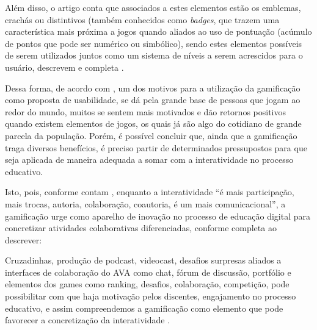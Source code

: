 Além disso, o artigo conta que associados a estes elementos estão os emblemas, crachás ou distintivos (também conhecidos como \textsl{badges}, que trazem uma característica mais próxima a jogos quando aliados ao uso de pontuação (acúmulo de pontos que pode ser numérico ou simbólico), sendo estes elementos possíveis de serem utilizados juntos como um sistema de níveis a serem acrescidos para o usuário, descrevem  e completa  .

Dessa forma, de acordo com , um dos motivos para a utilização da gamificação como proposta de usabilidade, se dá pela grande base de pessoas que jogam ao redor do mundo, muitos se sentem mais motivados e dão retornos positivos quando existem elementos de jogos, os quais já são algo do cotidiano de grande parcela da população. Porém, é possível concluir que, ainda que a gamificação traga diversos benefícios, é preciso partir de determinados pressupostos para que seja aplicada de maneira adequada a somar com a interatividade no processo educativo. 

Isto, pois, conforme contam , enquanto a interatividade ``é mais participação, mais trocas, autoria, colaboração, coautoria, é um mais comunicacional'', a gamificação urge como aparelho de inovação no processo de educação digital para concretizar atividades colaborativas diferenciadas, conforme completa ao descrever:

\begin{citacao}
Cruzadinhas,  produção de  podcast,  videocast,  desafios  surpresas  aliados  a  interfaces  de colaboração do  AVA  como  chat,  fórum  de  discussão,  portfólio e  elementos  dos  games  como ranking,  desafios,  colaboração,  competição, pode  possibilitar  com  que  haja  motivação  pelos discentes, engajamento no processo educativo, e assim compreendemos a gamificação como elemento que pode favorecer a concretização da interatividade \cite{valentim2016interatividade}.
\end{citacao}


